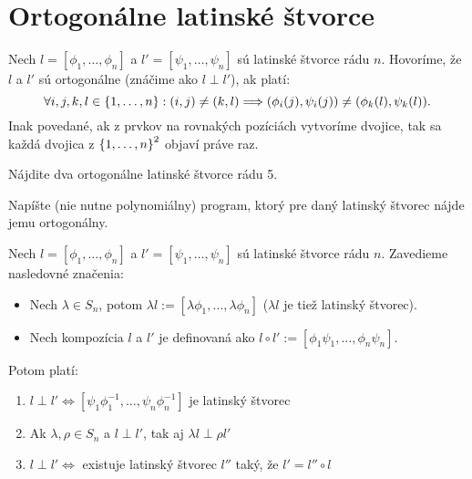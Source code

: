 \section{Ortogonálne latinské štvorce}

\begin{definition}
\label{def:ols}
Nech $l = [\phi_1, \ldots, \phi_n]$ a $l' = [\psi_1, \ldots, \psi_n]$ sú latinské štvorce rádu $n$. 
Hovoríme, že $l$ a $l'$ sú ortogonálne (znáčime ako $l \perp l'$), ak platí: 
$$\forall i,j,k,l \in \left\{1, \ldots, n\right\}: (i, j) \neq (k, l) \Longrightarrow (\phi_i(j), \psi_i(j)) \neq  (\phi_k(l), \psi_k(l)).$$
Inak povedané, ak z prvkov na rovnakých pozíciách vytvoríme dvojice, tak sa každá dvojica z $\left\{1, \ldots, n\right\}^2$ objaví práve raz.
\end{definition}


\begin{exercise}
Nájdite dva ortogonálne latinské štvorce rádu 5.
\end{exercise}

\begin{exercise}
Napíšte (nie nutne polynomiálny) program, ktorý pre daný latinský štvorec nájde jemu ortogonálny.
\end{exercise}


\begin{theorem}
\label{thm:lsorto}
Nech $l = [\phi_1, \ldots, \phi_n]$ a $l' = [\psi_1, \ldots, \psi_n]$ sú latinské štvorce rádu $n$.
Zavedieme nasledovné značenia:
\begin{itemize}
    \item Nech $\lambda \in S_n$, potom $\lambda l := [\lambda \phi_1, \ldots, \lambda \phi_n]$ ($\lambda l$ je tiež latinský štvorec). 
    \item Nech kompozícia $l$ a $l'$ je definovaná ako $l \circ l' := [\phi_1 \psi_1, \ldots, \phi_n \psi_n]$.
\end{itemize}

Potom platí:

\begin{enumerate}
    \item $l \perp l' \Leftrightarrow [\psi_1 \phi_1^{-1}, \ldots, \psi_n \phi_n^{-1}]$ je latinský štvorec
    \item Ak $\lambda, \rho \in S_n$ a $l \perp l'$,  tak aj $\lambda l \perp \rho l'$
    \item $l \perp l' \Leftrightarrow$ existuje latinský štvorec $l''$ taký, že $l' = l'' \circ l$ 
\end{enumerate}
    
\end{theorem}


